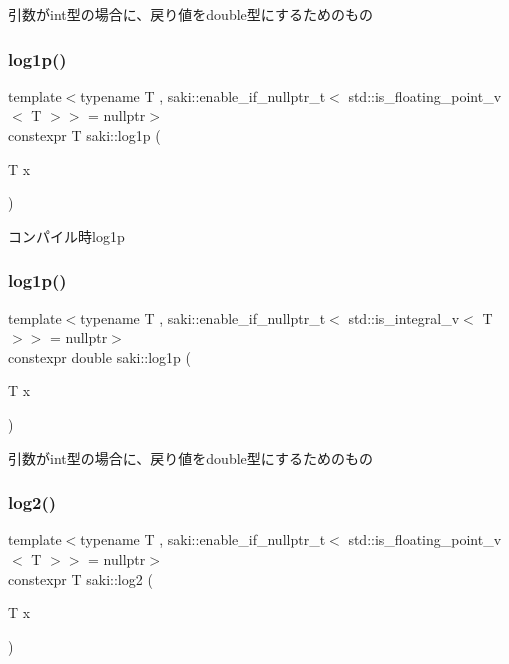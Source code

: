 引数がint型の場合に、戻り値をdouble型にするためのもの 

\mbox{\label{namespacesaki_ae0b2550b674acc69fa1fbe407917fdc7}} 
\subsubsection{\texorpdfstring{log1p()}{log1p()}\hspace{0.1cm}{\footnotesize\ttfamily [1/2]}}
{\footnotesize\ttfamily template$<$typename T , saki\+::enable\+\_\+if\+\_\+nullptr\+\_\+t$<$ std\+::is\+\_\+floating\+\_\+point\+\_\+v$<$ T $>$$>$  = nullptr$>$ \\
constexpr T saki\+::log1p (\begin{DoxyParamCaption}\item[{T}]{x }\end{DoxyParamCaption})}



コンパイル時log1p 

\mbox{\label{namespacesaki_aec755aa143bd9a0d03c5ebb2dc5dd3de}} 
\subsubsection{\texorpdfstring{log1p()}{log1p()}\hspace{0.1cm}{\footnotesize\ttfamily [2/2]}}
{\footnotesize\ttfamily template$<$typename T , saki\+::enable\+\_\+if\+\_\+nullptr\+\_\+t$<$ std\+::is\+\_\+integral\+\_\+v$<$ T $>$$>$  = nullptr$>$ \\
constexpr double saki\+::log1p (\begin{DoxyParamCaption}\item[{T}]{x }\end{DoxyParamCaption})}



引数がint型の場合に、戻り値をdouble型にするためのもの 

\mbox{\label{namespacesaki_ac184cde6c3531e01531219e081e25452}} 
\subsubsection{\texorpdfstring{log2()}{log2()}\hspace{0.1cm}{\footnotesize\ttfamily [1/2]}}
{\footnotesize\ttfamily template$<$typename T , saki\+::enable\+\_\+if\+\_\+nullptr\+\_\+t$<$ std\+::is\+\_\+floating\+\_\+point\+\_\+v$<$ T $>$$>$  = nullptr$>$ \\
constexpr T saki\+::log2 (\begin{DoxyParamCaption}\item[{T}]{x }\end{DoxyParamCaption})}



